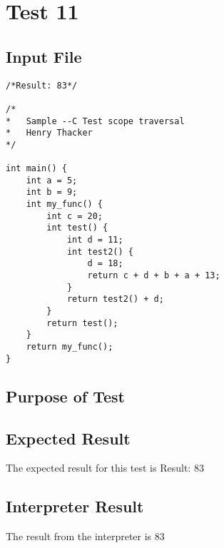 \section{Test 11}
\subsection{Input File}
\begin{verbatim}
/*Result: 83*/

/*
*	Sample --C Test scope traversal
*	Henry Thacker
*/

int main() {
	int a = 5;
	int b = 9;
	int my_func() {
		int c = 20;		
		int test() {
			int d = 11;
			int test2() {  
				d = 18;
				return c + d + b + a + 13;
			}
			return test2() + d;
		}
		return test();
	}
	return my_func();
}\end{verbatim}\subsection{Purpose of Test}

\subsection{Expected Result}
The expected result for this test is Result: 83
\subsection{Interpreter Result}
The result from the interpreter is 83

